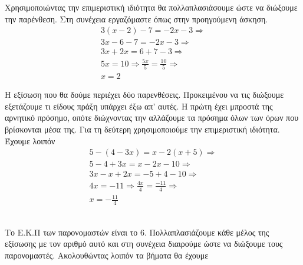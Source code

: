 \begin{alist}
\item Χρησιμοποιώντας την επιμεριστική ιδιότητα θα πολλαπλασιάσουμε ώστε να διώξουμε την παρένθεση. Στη συνέχεια εργαζόμαστε όπως στην προηγούμενη άσκηση.
\begin{gather*}
3(x-2)-7=-2x-3\Rightarrow\\
3x-6-7=-2x-3\Rightarrow\\
3x+2x=6+7-3\Rightarrow\\
5x=10\Rightarrow \frac{5x}{5}=\frac{10}{5}\Rightarrow\\
x=2
\end{gather*}
\item Η εξίσωση που θα δούμε περιέχει δύο παρενθέσεις. Προκειμένου να τις διώξουμε εξετάζουμε τι είδους πράξη υπάρχει έξω απ' αυτές.  Η πρώτη έχει μπροστά της αρνητικό πρόσημο, οπότε διώχνοντας την αλλάζουμε τα πρόσημα όλων των όρων που βρίσκονται μέσα της. Για τη δεύτερη χρησιμοποιούμε την επιμεριστική ιδιότητα. Έχουμε λοιπόν
\begin{gather*}
5-(4-3x)=x-2(x+5)\Rightarrow\\
5-4+3x=x-2x-10\Rightarrow\\
3x-x+2x=-5+4-10\Rightarrow\\
4x=-11\Rightarrow \frac{4x}{4}=\frac{-11}{4}\Rightarrow\\
x=-\frac{11}{4}
\end{gather*}
\end{alist}
\lysh\\
Το Ε.Κ.Π των παρονομαστών είναι το $ 6 $. Πολλαπλασιάζουμε κάθε μέλος της εξίσωσης με τον αριθμό αυτό και στη συνέχεια διαιρούμε ώστε να διώξουμε τους παρονομαστές. Ακολουθώντας λοιπόν τα βήματα θα έχουμε\\
